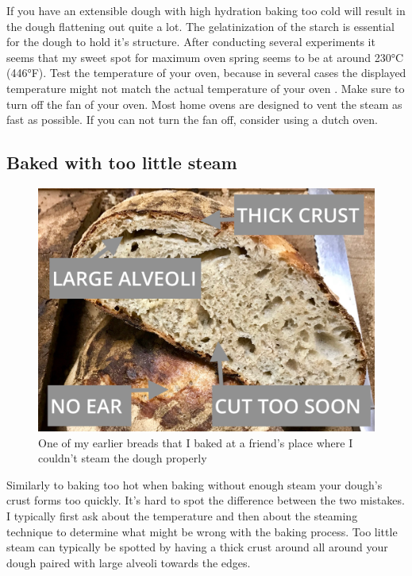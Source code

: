 If you have an extensible dough with high hydration baking too cold will result
in the dough flattening out quite a lot. The gelatinization of the starch is
essential for the dough to hold it's structure. After conducting several
experiments it seems that my sweet spot for maximum oven spring seems to be
at around 230°C (446°F). Test the temperature of your oven, because in several
cases the displayed temperature might not match the actual temperature of your
oven \cite{too+hot+baking}. Make sure to turn off the fan of your oven. Most
home ovens are designed to vent the steam as fast as possible. If you can not
turn the fan off, consider using a dutch oven.

\subsection{Baked with too little steam}

\begin{figure}[h]
  \includegraphics[width=\textwidth]{no-steam}
  \caption{One of my earlier breads that I baked at a friend's place where
  I couldn't steam the dough properly}
  \label{no-steam}
\end{figure}

Similarly to baking too hot when baking without enough steam your dough's crust
forms too quickly. It's hard to spot the difference between the two mistakes.
I typically first ask about the temperature and then about the steaming technique
to determine what might be wrong with the baking process. Too little steam can
typically be spotted by having a thick crust around all around your dough paired
with large alveoli towards the edges.

